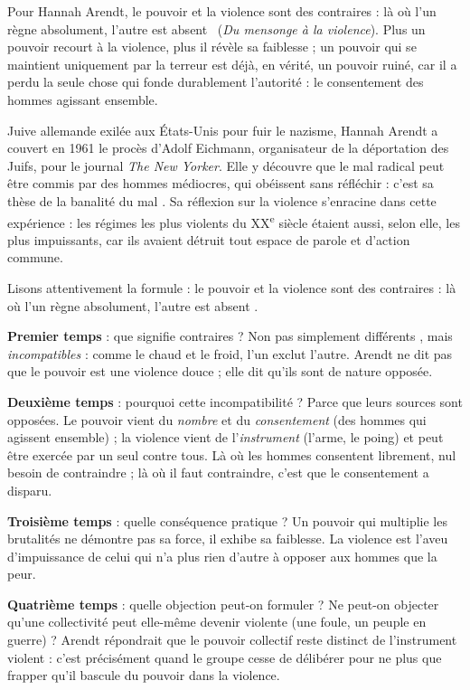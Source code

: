 \documentclass[11pt]{article}
\begin{document}
\begin{propriete}
Pour Hannah Arendt, \guillemotleft le pouvoir et la violence sont des contraires : là où l'un règne absolument, l'autre est absent \guillemotright\ (\emph{Du mensonge à la violence}). Plus un pouvoir recourt à la violence, plus il révèle sa faiblesse ; un pouvoir qui se maintient uniquement par la terreur est déjà, en vérité, un pouvoir ruiné, car il a perdu la seule chose qui fonde durablement l'autorité : le consentement des hommes agissant ensemble.
\end{propriete}

\begin{savaistu}
Juive allemande exilée aux États-Unis pour fuir le nazisme, Hannah Arendt a couvert en 1961 le procès d'Adolf Eichmann, organisateur de la déportation des Juifs, pour le journal \emph{The New Yorker}. Elle y découvre que le mal radical peut être commis par des hommes médiocres, qui obéissent sans réfléchir : c'est sa thèse de la \guillemotleft banalité du mal \guillemotright. Sa réflexion sur la violence s'enracine dans cette expérience : les régimes les plus violents du XX\textsuperscript{e} siècle étaient aussi, selon elle, les plus impuissants, car ils avaient détruit tout espace de parole et d'action commune.
\end{savaistu}

\begin{experience}
Lisons attentivement la formule : \guillemotleft le pouvoir et la violence sont des contraires : là où l'un règne absolument, l'autre est absent \guillemotright.

\textbf{Premier temps} : que signifie \guillemotleft contraires \guillemotright ? Non pas simplement \guillemotleft différents \guillemotright, mais \emph{incompatibles} : comme le chaud et le froid, l'un exclut l'autre. Arendt ne dit pas que le pouvoir est une violence douce ; elle dit qu'ils sont de nature opposée.

\textbf{Deuxième temps} : pourquoi cette incompatibilité ? Parce que leurs sources sont opposées. Le pouvoir vient du \emph{nombre} et du \emph{consentement} (des hommes qui agissent ensemble) ; la violence vient de l'\emph{instrument} (l'arme, le poing) et peut être exercée par un seul contre tous. Là où les hommes consentent librement, nul besoin de contraindre ; là où il faut contraindre, c'est que le consentement a disparu.

\textbf{Troisième temps} : quelle conséquence pratique ? Un pouvoir qui multiplie les brutalités ne démontre pas sa force, il exhibe sa faiblesse. La violence est l'aveu d'impuissance de celui qui n'a plus rien d'autre à opposer aux hommes que la peur.

\textbf{Quatrième temps} : quelle objection peut-on formuler ? Ne peut-on objecter qu'une collectivité peut elle-même devenir violente (une foule, un peuple en guerre) ? Arendt répondrait que le pouvoir collectif reste distinct de l'instrument violent : c'est précisément quand le groupe cesse de délibérer pour ne plus que frapper qu'il bascule du pouvoir dans la violence.
\end{experience}
\end{document}
